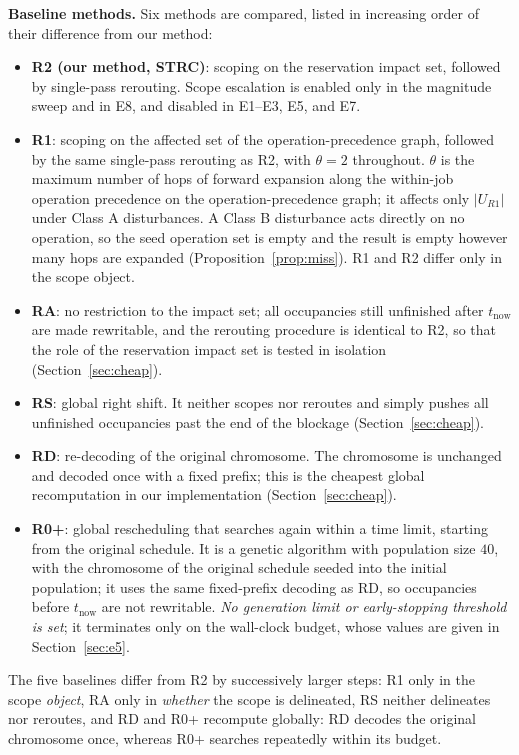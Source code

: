 \documentclass[manuscript,screen,review]{acmart}
\providecommand{\STRC}{\textsc{STRC}}
\begin{document}
\textbf{Baseline methods.}
Six methods are compared, listed in increasing order of their difference from our method:
\begin{itemize}[leftmargin=1.5em,itemsep=0.2em]
\item \textbf{R2 (our method, \STRC)}: scoping on the reservation impact set, followed by single-pass rerouting.
Scope escalation is enabled only in the magnitude sweep and in E8, and disabled in E1--E3, E5, and E7.
\item \textbf{R1}: scoping on the affected set of the operation-precedence graph, followed by the same single-pass rerouting as R2, with \(\theta=2\) throughout.
\(\theta\) is the maximum number of hops of forward expansion along the within-job operation precedence on the operation-precedence graph; it affects only \(|U_{R1}|\) under Class A disturbances.
A Class B disturbance acts directly on no operation, so the seed operation set is empty and the result is empty however many hops are expanded (Proposition~\ref{prop:miss}).
R1 and R2 differ only in the scope object.
\item \textbf{RA}: no restriction to the impact set; all occupancies still unfinished after \(t_{\mathrm{now}}\) are made rewritable,
and the rerouting procedure is identical to R2, so that the role of the reservation impact set is tested in isolation (Section~\ref{sec:cheap}).
\item \textbf{RS}: global right shift. It neither scopes nor reroutes and simply pushes all unfinished occupancies past the end of the blockage (Section~\ref{sec:cheap}).
\item \textbf{RD}: re-decoding of the original chromosome. The chromosome is unchanged and decoded once with a fixed prefix; this is the cheapest global recomputation in our implementation (Section~\ref{sec:cheap}).
\item \textbf{R0+}: global rescheduling that searches again within a time limit, starting from the original schedule. It is a genetic algorithm with population size \(40\),
with the chromosome of the original schedule seeded into the initial population; it uses the same fixed-prefix decoding as RD, so occupancies before \(t_{\mathrm{now}}\) are not rewritable.
\emph{No generation limit or early-stopping threshold is set}; it terminates only on the wall-clock budget, whose values are given in Section~\ref{sec:e5}.
\end{itemize}
The five baselines differ from R2 by successively larger steps: R1 only in the scope \emph{object}, RA only in \emph{whether} the scope is delineated,
RS neither delineates nor reroutes, and RD and R0+ recompute globally: RD decodes the original chromosome once, whereas R0+ searches repeatedly within its budget.
\end{document}
